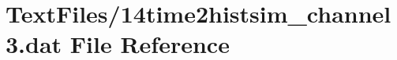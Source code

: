 \hypertarget{14time2histsim__channel3_8dat}{}\section{Text\+Files/14time2histsim\+\_\+channel3.dat File Reference}
\label{14time2histsim__channel3_8dat}
